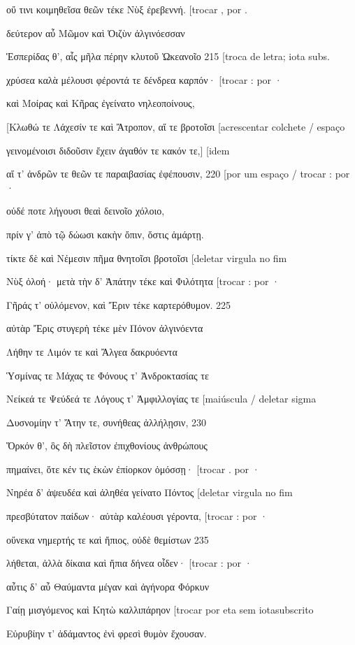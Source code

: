 οὔ τινι κοιμηθεῖσα θεῶν τέκε Νὺξ ἐρεβεννή. {[}trocar , por .

δεύτερον αὖ Μῶμον καὶ Ὀιζὺν ἀλγινόεσσαν

Ἑσπερίδας θ', αἷς μῆλα πέρην κλυτοῦ Ὠκεανοῖο 215 {[}troca de letra; iota
subs.

χρύσεα καλὰ μέλουσι φέροντά τε δένδρεα καρπόν· {[}trocar : por ·

καὶ Μοίρας καὶ Κῆρας ἐγείνατο νηλεοποίνους,

{[}Κλωθώ τε Λάχεσίν τε καὶ Ἄτροπον, αἵ τε βροτοῖσι {[}acrescentar
colchete / espaço

γεινομένοισι διδοῦσιν ἔχειν ἀγαθόν τε κακόν τε,{]} {[}idem

αἵ τ' ἀνδρῶν τε θεῶν τε παραιβασίας ἐφέπουσιν, 220 {[}por um espaço /
trocar : por ·

οὐδέ ποτε λήγουσι θεαὶ δεινοῖο χόλοιο,

πρίν γ' ἀπὸ τῷ δώωσι κακὴν ὄπιν, ὅστις ἁμάρτῃ.

τίκτε δὲ καὶ Νέμεσιν πῆμα θνητοῖσι βροτοῖσι {[}deletar virgula no fim

Νὺξ ὀλοή· μετὰ τὴν δ' Ἀπάτην τέκε καὶ Φιλότητα {[}trocar : por ·

Γῆράς τ' οὐλόμενον, καὶ Ἔριν τέκε καρτερόθυμον. 225

αὐτὰρ Ἔρις στυγερὴ τέκε μὲν Πόνον ἀλγινόεντα

Λήθην τε Λιμόν τε καὶ Ἄλγεα δακρυόεντα

Ὑσμίνας τε Μάχας τε Φόνους τ' Ἀνδροκτασίας τε

Νείκεά τε Ψεύδεά τε Λόγους τ' Ἀμφιλλογίας τε {[}maiúscula / deletar
sigma

Δυσνομίην τ' Ἄτην τε, συνήθεας ἀλλήλῃσιν, 230

Ὅρκόν θ', ὃς δὴ πλεῖστον ἐπιχθονίους ἀνθρώπους

πημαίνει, ὅτε κέν τις ἑκὼν ἐπίορκον ὀμόσσῃ· {[}trocar . por ·

Νηρέα δ' ἀψευδέα καὶ ἀληθέα γείνατο Πόντος {[}deletar virgula no fim

πρεσβύτατον παίδων· αὐτὰρ καλέουσι γέροντα, {[}trocar : por ·

οὕνεκα νημερτής τε καὶ ἤπιος, οὐδὲ θεμίστων 235

λήθεται, ἀλλὰ δίκαια καὶ ἤπια δήνεα οἶδεν· {[}trocar : por ·

αὖτις δ' αὖ Θαύμαντα μέγαν καὶ ἀγήνορα Φόρκυν

Γαίῃ μισγόμενος καὶ Κητὼ καλλιπάρηον {[}trocar por eta sem iotasubscrito

Εὐρυβίην τ' ἀδάμαντος ἐνὶ φρεσὶ θυμὸν ἔχουσαν.

